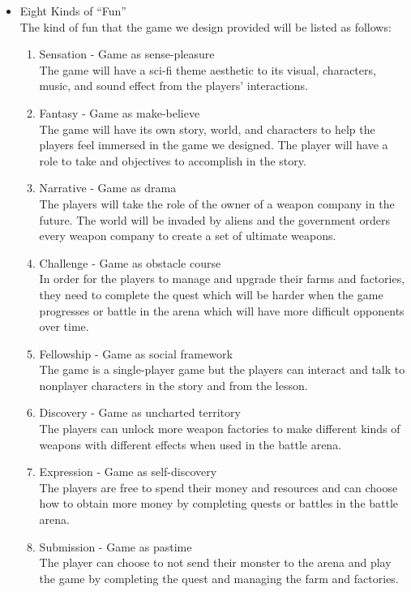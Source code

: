 \documentclass[12pt,oneside,openright,a4paper]{cpe-english-project}
\begin{document}
\begin{itemize}
\item Eight Kinds of “Fun” \\
The kind of fun that the game we design provided will be listed as follows:
\begin{enumerate}
	\item Sensation - Game as sense-pleasure \\
	The game will have a sci-fi theme aesthetic to its visual, characters, music, and sound effect from the players' interactions.
	\item Fantasy - Game as make-believe \\
	The game will have its own story, world, and characters to help the players feel immersed in the game we designed. The player will have a role to take and objectives to accomplish in the story.
	\item Narrative - Game as drama \\
	The players will take the role of the owner of a weapon company in the future. The world will be invaded by aliens and the government orders every weapon company to create a set of ultimate weapons.
	\item Challenge - Game as obstacle course \\
	In order for the players to manage and upgrade their farms and factories, they need to complete the quest which will be harder when the game progresses or battle in the arena which will have more difficult opponents over time.
	\item Fellowship - Game as social framework \\
	The game is a single-player game but the players can interact and talk to nonplayer characters in the story and from the lesson.
	\item Discovery - Game as uncharted territory \\
	The players can unlock more weapon factories to make different kinds of weapons with different effects when used in the battle arena.
	\item Expression - Game as self-discovery \\
	The players are free to spend their money and resources and can choose how to obtain more money by completing quests or battles in the battle arena.
	\item Submission - Game as pastime \\
	The player can choose to not send their monster to the arena and play the game by completing the quest and managing the farm and factories.
\end{enumerate}

\end{itemize}
\end{document}

